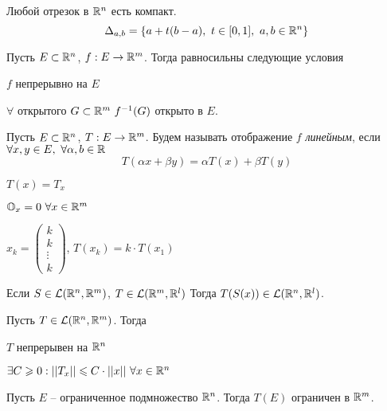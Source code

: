     \begin{Rem}
        Любой отрезок в $\mathbb{R}^n$ есть компакт.
        \[\Delta_{a, b} = \{a + t(b - a), \ t \in [0, 1], \ a, b \in \mathbb{R}^n\}\]
    \end{Rem}

    \begin{Thm}
        Пусть $E \subset \mathbb{R}^n$, $f : E \to \mathbb{R}^m$. Тогда равносильны следующие условия
        \begin{MyList}
            \item $f$ непрерывно на $E$
            \item $\forall $ открытого $G \subset \mathbb{R}^m \ f^{-1}(G)$ открыто в $E$.
        \end{MyList}
    \end{Thm}


    \begin{Def}
        Пусть $E \subset \mathbb{R}^n$, $T : E \to \mathbb{R}^m$. Будем называть отображение $f$ \textit{линейным}, если 
        $\forall x, y \in E, \ \forall \alpha, b \in \R$ 
        \[T(\alpha x + \beta y) = \alpha T(x) + \beta T(y)\]
    \end{Def} 

    \begin{notation}
        $T(x) = T_x$
    \end{notation}

    \begin{notation}
        $\mathbb{O}_x = 0 \ \forall x \in \mathbb{R}^m$
    \end{notation}

    \begin{notation}
        $x_k = \begin{pmatrix}
        k \\ 
        k \\ 
        \vdots \\ 
        k
        \end{pmatrix}$, $T(x_k) = k \cdot T(x_1)$  
    \end{notation}

    \begin{Rem}
        Если $S \in \mathcal{L} (\mathbb{R}^n, \mathbb{R}^m)$, $T \in \mathcal{L}(\mathbb{R}^m, \mathbb{R}^l)$ 
        Тогда $T(S(x)) \in \mathcal{L} (\mathbb{R}^n, \mathbb{R}^l)$. 
    \end{Rem}    

    \begin{Thm}
        Пусть $T \in \mathcal{L}(\mathbb{R}^n, \mathbb{R}^m)$. Тогда
        \begin{MyList} 
            \item $T$ непрерывен на $\mathbb{R}^n$
            \item $\exists C \geqslant 0 : ||T_x|| \leqslant C \cdot ||x|| \ \forall x \in \mathbb{R}^n$
            \item Пусть $E$ -- ограниченное подмножество $\mathbb{R}^n$. Тогда $T(E)$ ограничен в $\mathbb{R}^m$.
        \end{MyList}
    \end{Thm}

